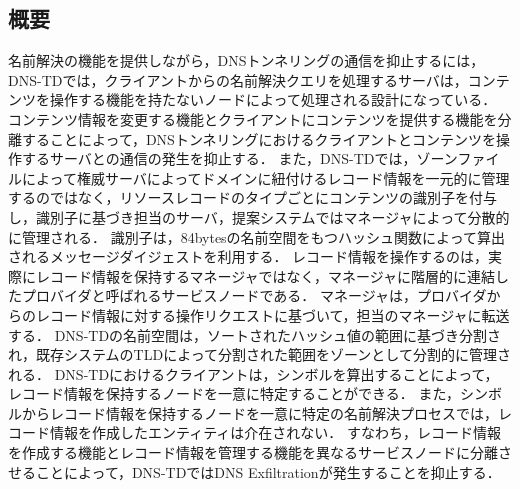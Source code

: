 \subsection{概要}
\label{sec:DNS-TD}
名前解決の機能を提供しながら，DNSトンネリングの通信を抑止するには，
DNS-TDでは，クライアントからの名前解決クエリを処理するサーバは，コンテンツを操作する機能を持たないノードによって処理される設計になっている．
コンテンツ情報を変更する機能とクライアントにコンテンツを提供する機能を分離することによって，DNSトンネリングにおけるクライアントとコンテンツを操作するサーバとの通信の発生を抑止する．
また，DNS-TDでは，ゾーンファイルによって権威サーバによってドメインに紐付けるレコード情報を一元的に管理するのではなく，リソースレコードのタイプごとにコンテンツの識別子を付与し，識別子に基づき担当のサーバ，提案システムではマネージャによって分散的に管理される．
識別子は，84bytesの名前空間をもつハッシュ関数によって算出されるメッセージダイジェストを利用する．
レコード情報を操作するのは，実際にレコード情報を保持するマネージャではなく，マネージャに階層的に連結したプロバイダと呼ばれるサービスノードである．
マネージャは，プロバイダからのレコード情報に対する操作リクエストに基づいて，担当のマネージャに転送する．
DNS-TDの名前空間は，ソートされたハッシュ値の範囲に基づき分割され，既存システムのTLDによって分割された範囲をゾーンとして分割的に管理される．
DNS-TDにおけるクライアントは，シンボルを算出することによって，レコード情報を保持するノードを一意に特定することができる．
また，シンボルからレコード情報を保持するノードを一意に特定の名前解決プロセスでは，レコード情報を作成したエンティティは介在されない．
すなわち，レコード情報を作成する機能とレコード情報を管理する機能を異なるサービスノードに分離させることによって，DNS-TDではDNS Exfiltrationが発生することを抑止する．

